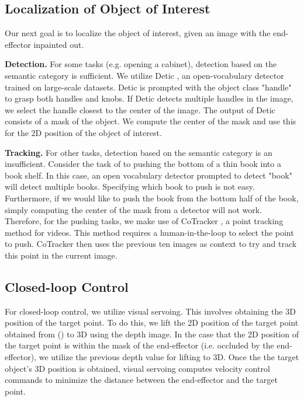 \subsection{Localization of Object of Interest}
Our next goal is to localize the object of interest, given an image with the end-effector inpainted out.

\textbf{Detection.}
For some tasks (e.g. opening a cabinet), detection based on the semantic category is sufficient. 
We utilize Detic \cite{zhou2022detecting}, an open-vocabulary detector trained on large-scale datasets.
Detic is prompted with the object class "handle" to grasp both handles and knobs.
If Detic detects multiple handles in the image, we select the handle closest to the center of the image.
The output of Detic consists of a mask of the object.
We compute the center of the mask and use this for the 2D position of the object of interest.

\textbf{Tracking.}
For other tasks, detection based on the semantic category is an insufficient.
Consider the task of to pushing the bottom of a thin book into a book shelf.
In this case, an open vocabulary detector prompted to detect "book" will detect multiple books.
Specifying which book to push is not easy. 
Furthermore, if we would like to push the book from the bottom half of the book, simply computing the center of the mask from a detector will not work. 
Therefore, for the pushing tasks, we make use of CoTracker \cite{karaev2023cotracker}, a point tracking method for videos.
This method requires a human-in-the-loop to select the point to push. 
CoTracker then uses the previous ten images as context to try and track this point in the current image.


\subsection{Closed-loop Control}
For closed-loop control, we utilize visual servoing.
This involves obtaining the 3D position of the target point.
To do this, we lift the 2D position of the target point obtained from () to 3D using the depth image.
In the case that the 2D position of the target point is within the mask of the end-effector (i.e. occluded by the end-effector), we utilize the previous depth value for lifting to 3D.
Once the the target object's 3D position is obtained, visual servoing computes velocity control commands to minimize the distance between the end-effector and the target point.

